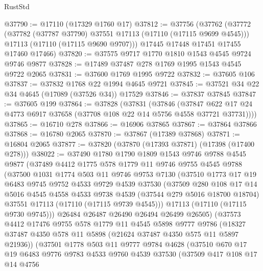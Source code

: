 \begin{lexlean}{RustStd}
\begin{coremodule}
@37790 := @17110 (@17329 @1760 @17)
@37812 := @37756
    (@37762
      (@37772
        (@37782 (@37787 @37790) @37551 @17113 (@17110 (@17115 @9699 @4545)))
        @17113
        (@17110 (@17115 @9690 @9707)))
      @17445
      @17448
      @17451
      @17455
      @17460
      @17466)
@37820 := @37575 @9717 @1770 @1810 @1543 @4545 @9724 @9746 @9877
@37828 := @17489 @37487 @278 @1769 @1995 @1543 @4545 @9722 @2065
@37831 := @37600 @1769 @1995 @9722
@37832 := @37605 @106
@37837 := @37832 @1768 @22 @1994 @4645 @9721
@37845 := @37521 @34 @22 @34 @4645 (@17089 (@37526 @34)) @17529
@37846 := @37837 @37845
@37847 := @37605 @199
@37864 := @37828
    (@37831
      (@37846
        (@37847 @622 @17 @24 @4773 @6917 @37658 (@37708 @108 @22 @14 @5756 @4558 @37721 @37731))))
@37865 := @16710 @278
@37866 := @16906 @37865
@37867 := @37864 @37866
@37868 := @16780 @2065
@37870 := @37867 (@17389 @37868)
@37871 := @16804 @2065
@37877 := @37820 (@37870 (@17393 @37871) (@17398 (@17400 @278)))
@38022 := @37490
    @1780
    @1790
    @1809
    @1543
    @9746
    @9788
    @4545
    @9877
    (@37489
      @4412
      @1775
      @578
      @1779
      @11
      @9746
      @9755
      @4545
      @9788
      (@37500
        @1031
        @1774
        @503
        @11
        @9746
        @9753
        @7130
        (@37510
          @1773
          @17
          @19
          @6483
          @9745
          @9752
          @4533
          @9729
          @4539
          @37530
          (@37509
            @280
            @108
            @17
            @14
            @5016
            @4545
            @4558
            @4533
            @9738
            @4539
            (@37544 @279 @5016 @18700 @18704)
            @37551
            @17113
            (@17110 (@17115 @9739 @4545)))
          @17113
          (@17110 (@17115 @9730 @9745)))
        @26484
        @26487
        @26490
        @26494
        @26499
        @26505)
      (@37573
        @4412
        @17476
        @9755
        @578
        @1779
        @11
        @4545
        @5898
        @9777
        @9786
        (@18327 @37487 @4350 @578 @11 @5898 (@21624 @37487 @4350 @575 @11 @5897 @21936))
        (@37501
          @1778
          @503
          @11
          @9777
          @9784
          @4628
          (@37510
            @670
            @17
            @19
            @6483
            @9776
            @9783
            @4533
            @9760
            @4539
            @37530
            (@37509
              @417
              @108
              @17
              @14
              @4756

\end{coremodule}
\end{lexlean}
